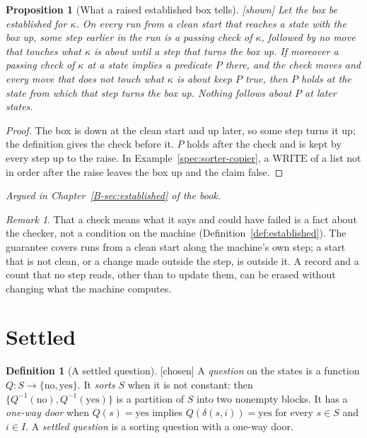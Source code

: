 \documentclass[11pt, a4paper]{article}
\theoremstyle{plain}
\newtheorem{proposition}[theorem]{Proposition}
\theoremstyle{definition}
\newtheorem{definition}[theorem]{Definition}
\theoremstyle{remark}
\newtheorem{remark}[theorem]{Remark}
\newcommand{\Bool}{\{\mathrm{no},\mathrm{yes}\}}
\newcommand{\step}{\delta}
\newcommand{\inv}{^{-1}}
\newcommand{\argued}[1]{\par\noindent\textit{Argued in Chapter~\ref{B-#1} of the book.}\par}
\newcommand{\kind}[1]{\textup{[#1]}}
\begin{document}
\begin{proposition}[What a raised established box tells]\label{spec:raised-tells} \kind{shown}
Let the box be established for $\kappa$. On every run from a clean start that reaches a state with the box
up, some step earlier in the run is a passing check of $\kappa$, followed by no move that touches what
$\kappa$ is about until a step that turns the box up. If moreover a passing check of $\kappa$ at a state
implies a predicate $P$ there, and the check moves and every move that does not touch what $\kappa$ is about
keep $P$ true, then $P$ holds at the state from which that step turns the box up. Nothing follows about $P$
at later states.
\end{proposition}
\begin{proof}
The box is down at the clean start and up later, so some step turns it up; the definition gives the check
before it. $P$ holds after the check and is kept by every step up to the raise. In
Example~\ref{spec:sorter-copier}, a $\mathrm{WRITE}$ of a list not in order after the raise leaves the box up
and the claim false.
\end{proof}
\argued{sec:established}

\begin{remark}\label{spec:established-scope}
That a check means what it says and could have failed is a fact about the checker, not a condition on the
machine (Definition~\ref{def:established}). The guarantee covers runs from a clean start along the
machine's own step; a start that is not clean, or a change made outside the step, is outside it. A record
and a count that no step reads, other than to update them, can be erased without changing what the machine
computes.
\end{remark}

\section{Settled}\label{spec:ch09}

\begin{definition}[A settled question]\label{spec:settled-def} \kind{chosen}
A \emph{question} on the states is a function $Q:S\to\Bool$. It \emph{sorts} $S$ when it is not constant:
then $\{Q\inv(\mathrm{no}),Q\inv(\mathrm{yes})\}$ is a partition of $S$ into two nonempty blocks. It has a
\emph{one-way door} when $Q(s)=\mathrm{yes}$ implies $Q(\step(s,i))=\mathrm{yes}$ for every $s\in S$ and
$i\in I$. A \emph{settled question} is a sorting question with a one-way door.
\end{definition}
\end{document}
